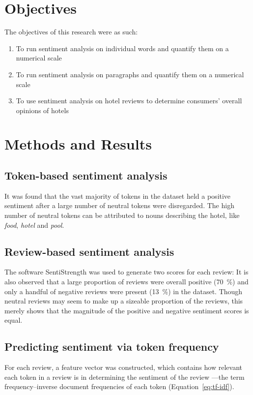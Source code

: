 \documentclass[11pt, a4paper]{pancake-article}
\begin{document}
\section{Objectives}
The objectives of this research were as such:
\begin{enumerate}
	\item To run sentiment analysis on individual words and quantify them on a numerical scale
	\item To run sentiment analysis on paragraphs and quantify them on a numerical scale
	\item To use sentiment analysis on hotel reviews to determine consumers' overall opinions of hotels
\end{enumerate}

\section{Methods and Results}

\subsection{Token-based sentiment analysis}\label{sec:tokens}
It was found that the vast majority
of tokens in the dataset held a positive sentiment  after a large number of neutral tokens were disregarded.
The high number of neutral tokens can be attributed to nouns
describing the hotel, like \textit{food}, \textit{hotel} and \textit{pool}.

\subsection{Review-based sentiment analysis}\label{sec:reviews}

The software SentiStrength was used to generate two scores for each review:
It is also observed that a large proportion of reviews were overall positive (\qty{70}{\percent})
and only a handful of negative reviews were present (\qty{13}{\percent}) in the dataset.
Though neutral reviews may seem to make up a sizeable proportion of the reviews, this merely
shows that the magnitude of the positive and negative sentiment scores is equal.

\subsection{Predicting sentiment via token frequency}

For each review, a feature vector was constructed, which contains how
relevant each token in a review is in determining the sentiment of the review
---the term frequency--inverse document frequencies of each token (Equation~\ref{eq:tf-idf}).
\end{document}
